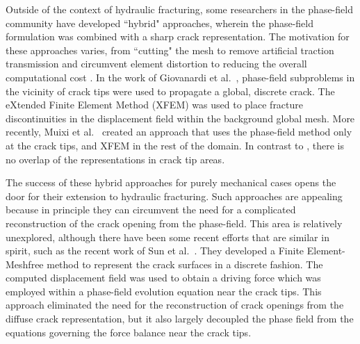 Outside of the context of hydraulic fracturing, some researchers in the phase-field community have developed ``hybrid" approaches, wherein the phase-field formulation was combined with a sharp crack representation. The motivation for these approaches varies, from ``cutting" the mesh to remove artificial traction transmission and circumvent element distortion \cite{geelen2018optimization} to reducing the overall computational cost \cite{giovanardi2017hybrid, muixi2021combined}. In the work of Giovanardi et al.\ \cite{giovanardi2017hybrid}, phase-field subproblems in the vicinity of  crack tips were used to propagate a global, discrete crack. The eXtended Finite Element Method (XFEM)\cite{moes1999finite} was used to place fracture discontinuities in the displacement field within the background global mesh. More recently, Muixi et al.\ \cite{muixi2021combined} created an approach that uses the phase-field method only at the crack tips, and XFEM in the rest of the domain. In contrast to \cite{giovanardi2017hybrid}, there is no overlap of the representations in crack tip areas.

The success of these hybrid approaches for purely mechanical cases opens the door for their extension to hydraulic fracturing.  Such approaches are appealing because in principle they can circumvent the need for a complicated reconstruction of the crack opening from the phase-field.  This area is relatively unexplored, although there have been some recent efforts that are similar in spirit, such as the recent work of Sun et al.\ \cite{sun2020hybrid}.  They developed a Finite Element-Meshfree method to represent the crack surfaces in a discrete fashion. The computed displacement field was used to obtain a driving force which was employed within a phase-field evolution equation near the crack tips. This approach eliminated the need for the reconstruction of crack openings from the diffuse crack representation, but it also largely decoupled the phase field from the equations governing the force balance near the crack tips.  


